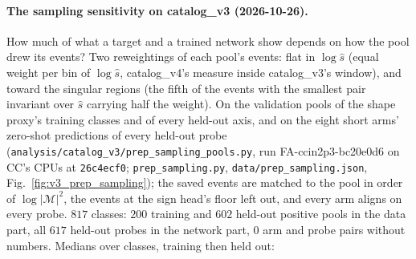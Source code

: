 \documentclass[11pt]{article}
\newcommand{\code}[1]{\texttt{#1}}
\begin{document}
\paragraph{The sampling sensitivity on catalog\_v3 (2026-10-26).}\label{par:v3_prep_sampling} How much of what a target
and a trained network show depends on how the pool drew its events? Two reweightings of each pool's events: flat in
$\log\hat s$ (equal weight per bin of $\log\hat s$, catalog\_v4's measure inside catalog\_v3's window), and toward the
singular regions (the fifth of the events with the smallest pair invariant over $\hat s$ carrying half the weight).
On the validation pools of the shape proxy's training classes and of every held-out axis, and on the eight short arms'
zero-shot predictions of every held-out probe (\code{analysis/catalog\_v3/prep\_sampling\_pools.py}, run
FA-ccin2p3-bc20e0d6 on CC's CPUs at \code{26c4ecf0}; \code{prep\_sampling.py}, \code{data/prep\_sampling.json},
Fig.~\ref{fig:v3_prep_sampling}); the saved events are matched to the pool in order of $\log|\mathcal M|^2$, the events
at the sign head's floor left out, and every arm aligns on every probe.
$817$ classes: $200$ training and $602$ held-out positive pools in the data part, all $617$ held-out probes in the
network part, $0$ arm and probe pairs without numbers. Medians over classes, training then held out:
\end{document}
